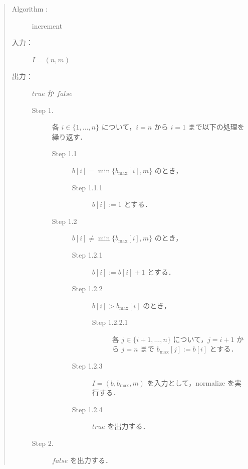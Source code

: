 \documentclass[12pt]{optlab-bachelor}
\begin{document}
\begin{quote}
  \begin{description}
    \item[{\sc Algorithm : }]  {\sc increment}
    \item[入力：] $I = (n, m)$
    \item[出力：] $true$ か $false$
    \begin{description}
      \item[Step 1.] 各 $i \in \{1,\ldots,n\}$ について，$i = n$ から $i = 1$ まで以下の処理を繰り返す．
      \begin{description}
        \item[Step 1.1] $b[i] = \min\{b_{\max}[i], m\}$ のとき，
        \begin{description}
          \item[Step 1.1.1] $b[i] := 1$ とする．
        \end{description}
        \item[Step 1.2] $b[i] \neq \min\{b_{\max}[i], m\}$ のとき，
        \begin{description}
          \item[Step 1.2.1] $b[i] := b[i] + 1$ とする．
          \item[Step 1.2.2] $b[i] > b_{\max}[i]$ のとき，
          \begin{description}
            \item[Step 1.2.2.1] 各 $j \in \{i + 1,\ldots,n\}$ について，$j = i + 1$ から $j = n$ まで $b_{\max}[j] := b[i]$ とする．
          \end{description}
          \item[Step 1.2.3] $I = (b,b_{\max},m)$ を入力として，{\sc normalize} を実行する．
          \item[Step 1.2.4] $true$ を出力する．
        \end{description}
      \end{description}
      \item[Step 2.] $false$ を出力する．
    \end{description}
  \end{description}
\end{quote}



\end{document}

